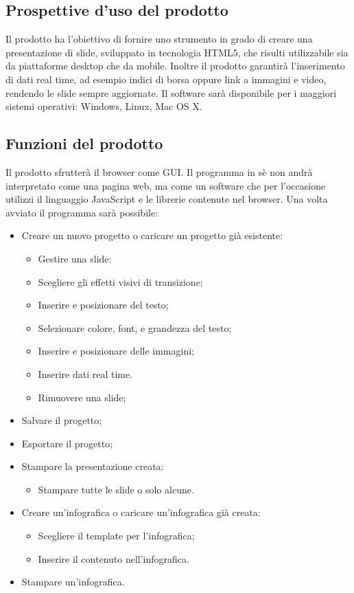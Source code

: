 \subsection{Prospettive d'uso del prodotto}
Il prodotto ha l'obiettivo di fornire uno strumento in grado di creare una presentazione di slide, sviluppato in tecnologia HTML5, che risulti utilizzabile sia da piattaforme desktop che da mobile. Inoltre il prodotto garantirà l'inserimento di dati real time, ad esempio indici di borsa oppure link a immagini e video, rendendo le slide sempre aggiornate. Il software sarà disponibile per i maggiori sistemi operativi: Windows, Linux, Mac OS X.

\subsection{Funzioni del prodotto}
Il prodotto sfrutterà il browser come GUI. Il programma in sè non andrà interpretato come una pagina web, ma come un software che per l'occasione utilizzi il linguaggio JavaScript e le librerie contenute nel browser.
Una volta avviato il programma sarà possibile:
\begin{itemize}
	\item Creare un nuovo progetto o caricare un progetto già esistente:
	\begin{itemize}
		\item Gestire una slide:
		\item Scegliere gli effetti visivi di transizione;
		\item Inserire e posizionare del testo;
		\item Selezionare colore, font, e grandezza del testo;
		\item Inserire e posizionare delle immagini;
		\item Inserire dati real time.
		\item Rimuovere una slide;
	\end{itemize}
	\item Salvare il progetto;
	\item Esportare il progetto;
	\item Stampare la presentazione creata:
	\begin{itemize}
		\item Stampare tutte le slide o solo alcune.
	\end{itemize}
	\item Creare un'infografica o caricare un'infografica già creata:
	\begin{itemize}
		\item Scegliere il template per l'infografica;
		\item Inserire il contenuto nell'infografica.
	\end{itemize}
	\item Stampare un'infografica.
\end{itemize}

